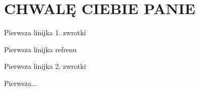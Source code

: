 \documentclass[../../../songbook.tex]{subfiles}
\begin{document}
\TabPositions{8cm} %
\section*{CHWALĘ CIEBIE PANIE}
\vspace{0.5cm}

Pierwsza linijka 1. zwrotki				     \newline	  

\-\hspace{1cm} Pierwsza linijka refrenu		\newline
      
Pierwsza linijka 2. zwrotki				     \newline

\-\hspace{1cm} Pierwsza...
\end{document}
